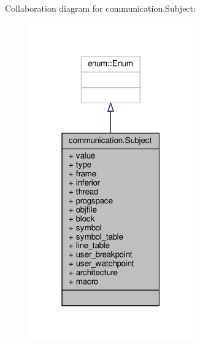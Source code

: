 Collaboration diagram for communication.\+Subject\+:
\nopagebreak
\begin{figure}[H]
\begin{center}
\leavevmode
\includegraphics[width=199pt]{classcommunication_1_1Subject__coll__graph}
\end{center}
\end{figure}
